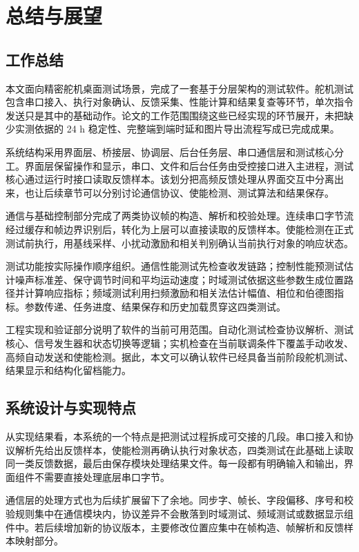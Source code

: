 \chapter{总结与展望}

\section{工作总结}

本文面向精密舵机桌面测试场景，完成了一套基于分层架构的测试软件。舵机测试包含串口接入、执行对象确认、反馈采集、性能计算和结果复查等环节，单次指令发送只是其中的基础动作。论文的工作范围围绕这些已经实现的环节展开，未把缺少实测依据的 24 h 稳定性、完整端到端时延和图片导出流程写成已完成成果。

系统结构采用界面层、桥接层、协调层、后台任务层、串口通信层和测试核心分工。界面层保留操作和显示，串口、文件和后台任务由受控接口进入主进程，测试核心通过运行时接口读取反馈样本。该划分把高频反馈处理从界面交互中分离出来，也让后续章节可以分别讨论通信协议、使能检测、测试算法和结果保存。

通信与基础控制部分完成了两类协议帧的构造、解析和校验处理。连续串口字节流经过缓存和帧边界识别后，转化为上层可以直接读取的反馈样本。使能检测在正式测试前执行，用基线采样、小扰动激励和相关判别确认当前执行对象的响应状态。

测试功能按实际操作顺序组织。通信性能测试先检查收发链路；控制性能预测试估计噪声标准差、保守调节时间和平均运动速度；时域测试依据这些参数生成位置路径并计算响应指标；频域测试利用扫频激励和相关法估计幅值、相位和伯德图指标。参数传递、任务进度、结果保存和历史加载贯穿这四类测试。

工程实现和验证部分说明了软件的当前可用范围。自动化测试检查协议解析、测试核心、信号发生器和状态切换等逻辑；实机检查在当前联调条件下覆盖手动收发、高频自动发送和使能检测。据此，本文可以确认软件已经具备当前阶段舵机测试、结果显示和结构化留档能力。

\section{系统设计与实现特点}

从实现结果看，本系统的一个特点是把测试过程拆成可交接的几段。串口接入和协议解析先给出反馈样本，使能检测再确认执行对象状态，四类测试在此基础上读取同一类反馈数据，最后由保存模块处理结果文件。每一段都有明确输入和输出，界面组件不需要直接处理底层串口字节。

通信层的处理方式也为后续扩展留下了余地。同步字、帧长、字段偏移、序号和校验规则集中在通信模块内，协议差异不会散落到时域测试、频域测试或数据显示组件中。若后续增加新的协议版本，主要修改位置应集中在帧构造、帧解析和反馈样本映射部分。

